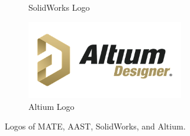 \begin{figure}[h]
\begin{subfigure}[b]{0.2\textwidth}
        \caption{SolidWorks Logo}
    \end{subfigure}
    \begin{subfigure}[b]{0.2\textwidth}
        \centering
        \includegraphics[width=0.75\textwidth]{Sections/6Conclusion/images/altium_logo.png}
        \caption{Altium Logo}
    \end{subfigure}
    \caption{Logos of MATE, AAST, SolidWorks, and Altium.}
    \label{fig:logos}
\end{figure}